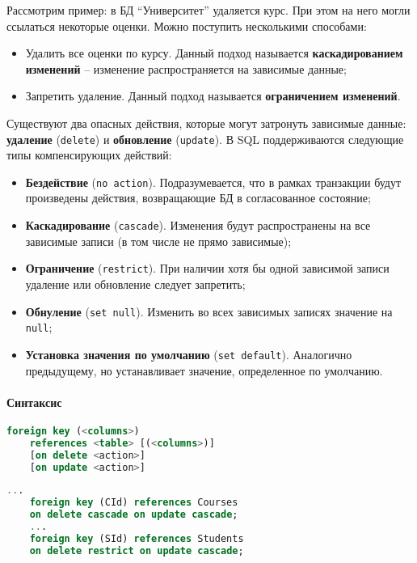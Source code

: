 Рассмотрим пример: в БД ``Университет'' удаляется курс. При этом на него могли ссылаться некоторые
оценки. Можно поступить несколькими способами:

\begin{itemize}
	\item Удалить все оценки по курсу. Данный подход называется \textbf{каскадированием изменений} -- изменение
	      распространяется на зависимые данные;
	\item Запретить удаление. Данный подход называется \textbf{ограничением изменений}.
\end{itemize}

Существуют два опасных действия, которые могут затронуть зависимые данные: \textbf{удаление}
(\texttt{delete}) и
\textbf{обновление} (\texttt{update}). В SQL поддерживаются следующие типы компенсирующих действий:

\begin{itemize}
	\item \textbf{Бездействие} (\texttt{no action}). Подразумевается, что в рамках транзакции будут
	      произведены действия, возвращающие БД в согласованное состояние;
	\item \textbf{Каскадирование} (\texttt{cascade}). Изменения будут распространены на все
	      зависимые записи (в том числе не прямо зависимые);
	\item \textbf{Ограничение} (\texttt{restrict}). При наличии хотя бы одной зависимой записи
	      удаление или обновление следует запретить;
	\item \textbf{Обнуление} (\texttt{set null}). Изменить во всех зависимых записях значение на
	      \texttt{null};
	\item \textbf{Установка значения по умолчанию} (\texttt{set default}). Аналогично предыдущему,
	      но устанавливает значение, определенное по умолчанию.
\end{itemize}

\paragraph{Синтаксис}
\enewline

\begin{lstlisting}[language=SQL]
    foreign key (<columns>)
    references <table> [(<columns>)]
    [on delete <action>]
    [on update <action>]
\end{lstlisting}

\begin{examples}
	\enewline
	\begin{lstlisting}[language=SQL]
    ...
    foreign key (CId) references Courses
    on delete cascade on update cascade;
    ...
    foreign key (SId) references Students
    on delete restrict on update cascade;
    \end{lstlisting}
\end{examples}


